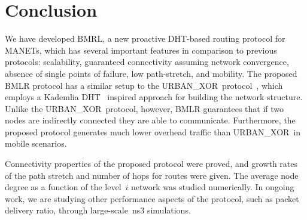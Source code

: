 \documentclass[conference]{IEEEtran}
\theoremstyle{definition}
\newcommand{\urbanxor}{URBAN\_XOR}
\begin{document}
\section{Conclusion}
\label{sec:conclusion}

We have developed BMRL, a new proactive DHT-based routing protocol for MANETs, which has several important features in comparison to previous protocols: scalability, guaranteed connectivity assuming network convergence,  absence of single points of failure, low path-stretch, and mobility. The proposed BMLR protocol has a similar setup to the \urbanxor\ protocol~\cite{Pasquini}, which employs a Kademlia DHT~\cite{kademlia} inspired approach for building the network structure. Unlike the \urbanxor\ protocol, however, BMLR guarantees that if two nodes are indirectly connected they are able to communicate. Furthermore, the proposed protocol generates much lower overhead traffic than \urbanxor\ in mobile scenarios.  

Connectivity properties of the proposed protocol were proved, and growth rates of the path stretch and number of hops for routes were given. The average node degree as a function of the level~$i$ network was studied numerically. In ongoing work, we are studying other performance aspects of the protocol, such as packet delivery ratio, through large-scale~ns3 simulations.




\end{document}
